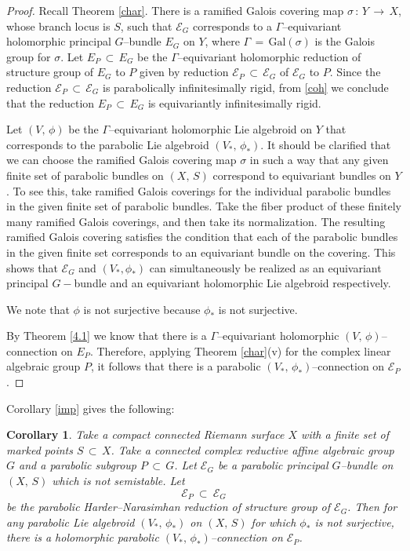 \documentclass[12pt, reqno]{amsart}
\numberwithin{equation}{section}
\newtheorem{corollary}[theorem]{Corollary}
\begin{document}
\begin{proof}
Recall Theorem \ref{char}. There is a ramified Galois covering map $\sigma\,:\, Y\,\longrightarrow\, X$,
whose branch locus is $S$, such that $\mathcal{E}_{G}$ corresponds to a
$\Gamma$--equivariant holomorphic principal $G$--bundle $E_G$ on $Y$, where $\Gamma\,=\, \text{Gal}(\sigma)$
is the Galois group for $\sigma$. Let $E_{P}\,\subset\, E_{G}$ be the $\Gamma$--equivariant holomorphic
reduction of structure group of $E_{G}$ to $P$ given by reduction $\mathcal{E}_{P}\, \subset\, \mathcal{E}_{G}$ of
$\mathcal{E}_{G}$ to $P$. Since the reduction $\mathcal{E}_{P}\, \subset\, \mathcal{E}_{G}$
is parabolically infinitesimally rigid, from \eqref{coh} we conclude that the reduction
$E_{P}\,\subset\, E_{G}$ is equivariantly infinitesimally rigid.

Let $(V,\,\phi)$ be the $\Gamma$--equivariant holomorphic Lie algebroid on $Y$ that corresponds to
the parabolic Lie algebroid $(V_{*},\, \phi_{*})$. It should be clarified that we can choose the
ramified Galois covering map $\sigma$ in such a way that any given finite set of parabolic bundles on
$(X,\,S)$ correspond to equivariant bundles on $Y$. To see this, take ramified Galois coverings for
the individual parabolic  bundles in the given finite set of parabolic
bundles. Take the fiber product of
these finitely many ramified Galois coverings, and then take its normalization. The resulting
ramified Galois covering satisfies the condition that each of the parabolic  bundles in the
given finite set corresponds to an equivariant  bundle on the covering. This shows that $\mathcal{E}_{G}$ and $(V_{*},\phi_{*})$ can simultaneously be realized as an equivariant principal $G-$bundle and an equivariant holomorphic Lie algebroid respectively.

We note that $\phi$ is not surjective because $\phi_{*}$ is not surjective.

By Theorem \ref{4.1} we know that there is a $\Gamma$--equivariant holomorphic $(V,\,\phi)$--connection on 
$E_{P}$. Therefore, applying Theorem \ref{char}(v) for the complex linear algebraic group $P$, it follows 
that there is a parabolic $(V_{*},\, \phi_{*})$--connection on $\mathcal{E}_{P}$.
\end{proof}

Corollary \ref{imp} gives the following:

\begin{corollary}\label{main}
Take a compact connected Riemann surface $X$ with a finite set of marked points $S\, \subset\, X$.
Take a connected complex reductive affine algebraic group $G$ and a parabolic subgroup $P\, \subset\, G$.
Let $\mathcal{E}_{G}$ be a parabolic principal $G$--bundle on $(X,\,S)$ which is not semistable. Let
\begin{equation}\label{hnr}
\mathcal{E}_{P}\ \subset\ \mathcal{E}_{G}
\end{equation}
be the parabolic 
Harder--Narasimhan reduction of structure group of $\mathcal{E}_{G}$.
Then for any parabolic Lie algebroid $(V_{*},\, \phi_{*})$ on $(X,\,S)$ for which $\phi_{*}$ is not surjective, 
there is a holomorphic parabolic $(V_{*},\, \phi_{*})$--connection on $\mathcal{E}_{P}$.
\end{corollary}
\end{document}
